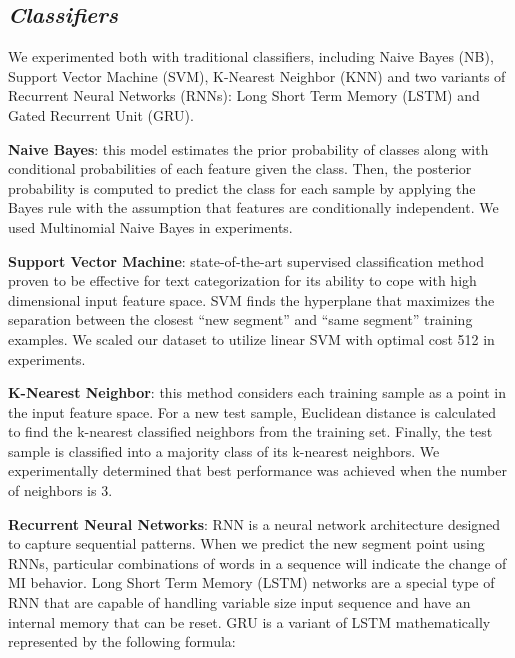 \documentclass{amia}
\begin{document}
\subsection*{\textit{Classifiers}}

We experimented both with traditional classifiers, including Naive Bayes (NB)\cite{mccallum1998comparison}, Support Vector Machine (SVM)\cite{cortes1995support}, K-Nearest Neighbor (KNN)\cite{keller1985fuzzy} and two variants of Recurrent Neural Networks (RNNs)\cite{lipton2015critical}: Long Short Term Memory (LSTM)\cite{hochreiter1997long} and Gated Recurrent Unit (GRU)\cite{chung2014empirical}. 

\textbf{Naive Bayes}: this model estimates the prior probability of classes along with conditional probabilities of each feature given the class. Then, the posterior probability is computed to predict the class for each sample by applying the Bayes rule with the assumption that features are conditionally independent. We used Multinomial Naive Bayes in experiments.

\textbf{Support Vector Machine}: state-of-the-art supervised classification method proven to be effective for text categorization\cite{joachims1998text} for its ability to cope with high dimensional input feature space. SVM finds the hyperplane that maximizes the separation between the closest ``new segment'' and ``same segment'' training examples. We scaled our dataset to utilize linear SVM with optimal cost 512 in experiments.   

\textbf{K-Nearest Neighbor}: this method considers each training sample as a point in the input feature space. For a new test sample, Euclidean distance is calculated to find the k-nearest classified neighbors from the training set. Finally, the test sample is classified into a majority class of its k-nearest neighbors. We experimentally determined that best performance was achieved when the number of neighbors is 3. 

\textbf{Recurrent Neural Networks}: RNN is a neural network architecture designed to capture sequential patterns. When we predict the new segment point using RNNs, particular combinations of words in a sequence will indicate the change of MI behavior. Long Short Term Memory (LSTM) networks\cite{hochreiter1997long} are a special type of RNN that are capable of handling variable size input sequence and have an internal memory that can be reset. GRU\cite{chung2014empirical} is a variant of LSTM mathematically represented by the following formula:
\end{document}
